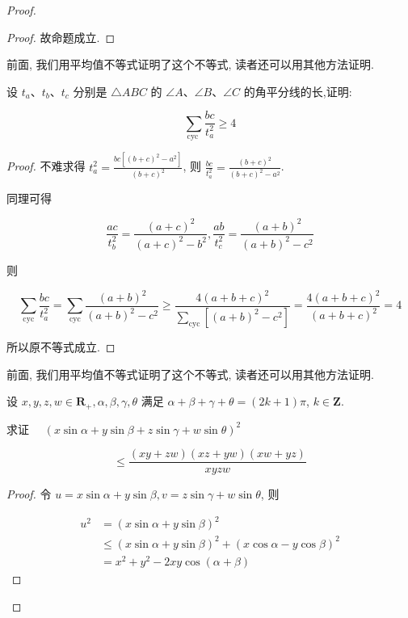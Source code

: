 \begin{proof}
\begin{proof}
	故命题成立.
\end{proof}
\begin{note}
	前面, 我们用平均值不等式证明了这个不等式, 读者还可以用其他方法证明.
\end{note}

\begin{example}
	设 $t_{a} 、 t_{b} 、 t_{c}$ 分别是 $\triangle A B C$ 的 $\angle A 、 \angle B 、 \angle C$ 的角平分线的长,证明:
	
	$$
	\sum_{\text {cyc }} \frac{b c}{t_{a}^{2}} \geqslant 4
	$$
\end{example}
\begin{proof}
	不难求得 $t_{a}^{2}=\frac{b c\left[(b+c)^{2}-a^{2}\right]}{(b+c)^{2}}$, 则 $\frac{b c}{t_{a}^{2}}=\frac{(b+c)^{2}}{(b+c)^{2}-a^{2}}$.
	
	同理可得
	
	$$
	\frac{a c}{t_{b}^{2}}=\frac{(a+c)^{2}}{(a+c)^{2}-b^{2}}, \frac{a b}{t_{c}^{2}}=\frac{(a+b)^{2}}{(a+b)^{2}-c^{2}}
	$$
	
	则
	
	$$
	\sum_{\mathrm{cyc}} \frac{b c}{t_{a}^{2}}=\sum_{\mathrm{cyc}} \frac{(a+b)^{2}}{(a+b)^{2}-c^{2}} \geqslant \frac{4(a+b+c)^{2}}{\sum_{\mathrm{cyc}}\left[(a+b)^{2}-c^{2}\right]}=\frac{4(a+b+c)^{2}}{(a+b+c)^{2}}=4
	$$
	
	所以原不等式成立.
\end{proof}
\begin{note}
	前面, 我们用平均值不等式证明了这个不等式, 读者还可以用其他方法证明.
\end{note}

\begin{example}
	设 $x, y, z, w \in \mathbf{R}_{+}, \alpha, \beta, \gamma, \theta$ 满足 $\alpha+\beta+\gamma+\theta=(2 k+1) \pi$, $k \in \mathbf{Z}$.
	
	求证 $\quad(x \sin \alpha+y \sin \beta+z \sin \gamma+w \sin \theta)^{2}$
	
	$$
	\leqslant \frac{(x y+z w)(x z+y w)(x w+y z)}{x y z w}
	$$
\end{example}
\begin{proof}
	令 $u=x \sin \alpha+y \sin \beta, v=z \sin \gamma+w \sin \theta$, 则
	
	$$
	\begin{aligned}
	u^{2} & =(x \sin \alpha+y \sin \beta)^{2} \\
	& \leqslant(x \sin \alpha+y \sin \beta)^{2}+(x \cos \alpha-y \cos \beta)^{2} \\
	& =x^{2}+y^{2}-2 x y \cos (\alpha+\beta)
	\end{aligned}
	$$
	

\end{proof}
\end{proof}
